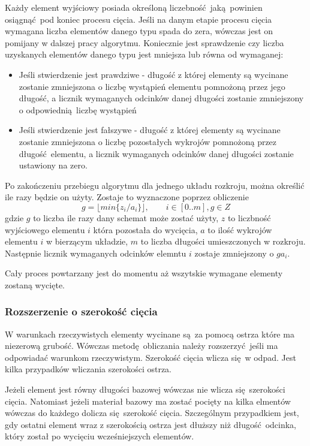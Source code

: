 Każdy element wyjściowy posiada określoną liczebność jaką powinien osiągnąć pod koniec procesu cięcia. Jeśli na danym etapie procesu cięcia wymagana liczba elementów danego typu spada do zera, wówczas jest on pomijany w dalszej pracy algorytmu. Koniecznie jest sprawdzenie czy liczba uzyskanych elementów danego typu jest mniejsza lub równa od wymaganej:
\begin{itemize}
  \item Jeśli stwierdzenie jest prawdziwe - długość z której elementy są wycinane zostanie zmniejszona o liczbę wystąpień elementu pomnożoną przez jego długość, a licznik wymaganych odcinków danej długości zostanie zmniejszony o odpowiednią liczbę wystąpień
  \item Jeśli stwierdzenie jest fałszywe - długość z której elementy są wycinane zostanie zmniejszona o liczbę pozostałych wykrojów pomnożoną przez długość elementu, a licznik wymaganych odcinków danej długości zostanie ustawiony na zero.
\end{itemize}
Po zakończeniu przebiegu algorytmu dla jednego układu rozkroju, można określić ile razy będzie on użyty. Zostaje to wyznaczone poprzez obliczenie
\begin{equation}
g = \lfloor min\{z_i/a_i\} \rfloor, \qquad i \in [0..m], g \in Z
\end{equation}
gdzie $g$ to liczba ile razy dany schemat może zostać użyty, $z$ to liczbność wyjściowego elementu $i$ która pozostała do wycięcia, $a$ to ilość wykrojów elementu $i$ w bierzącym układzie, $m$ to liczba długości umieszczonych w rozkroju. Następnie licznik wymaganych odcinków elemntu $i$ zostaje zmniejszony o $g a_i$.

Cały proces powtarzany jest do momentu aż wszytskie wymagane elementy zostaną wycięte.

\subsubsection{Rozszerzenie o szerokość cięcia}
W warunkach rzeczywistych elementy wycinane są za pomocą ostrza które ma niezerową grubość. Wówczas metodę obliczania należy rozszerzyć jeśli ma odpowiadać warunkom rzeczywistym. Szerokość cięcia wlicza się w odpad. Jest kilka przypadków wliczania szerokości ostrza.

Jeżeli element jest równy długości bazowej wówczas nie wlicza się szerokości cięcia. Natomiast jeżeli materiał bazowy ma zostać pocięty na kilka elmentów wówczas do każdego dolicza się szerokość cięcia. Szczególnym przypadkiem jest, gdy ostatni element wraz z szerokością ostrza jest dłuższy niż długość odcinka, który został po wycięciu wcześniejszych elementów.

